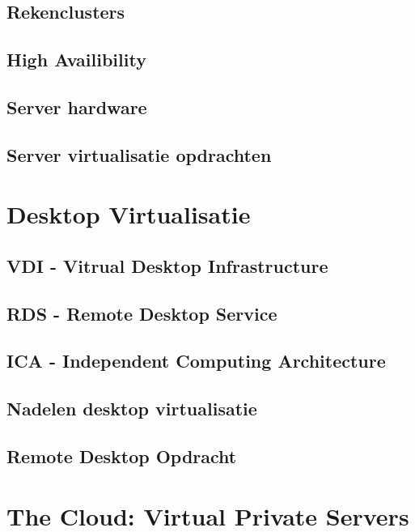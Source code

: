 \documentclass[a4paper,12pt,twoside,openright,titlepage]{book}
\begin{document}
\subsection{Rekenclusters}

\subsection{High Availibility}

\subsection{Server hardware}

\subsection{Server virtualisatie opdrachten}

\section{Desktop Virtualisatie}

\subsection{VDI - Vitrual Desktop Infrastructure}

\subsection{RDS - Remote Desktop Service}

\subsection{ICA - Independent Computing Architecture}

\subsection{Nadelen desktop virtualisatie}


\subsection{Remote Desktop Opdracht}

\section{The Cloud: Virtual Private Servers}
\end{document}
